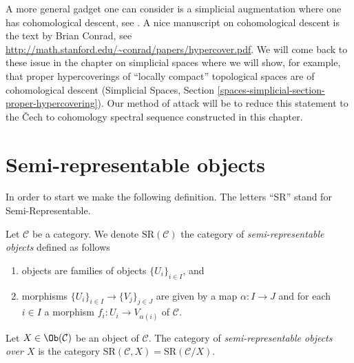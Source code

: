 \medskip\noindent
A more general gadget one can consider is a simplicial augmentation where
one has cohomological descent, see \cite[Expos\'e Vbis]{SGA4}. A nice
manuscript on cohomological descent is the text by Brian Conrad, see
\url{http://math.stanford.edu/~conrad/papers/hypercover.pdf}.
We will come back to these issue in the chapter on simplicial spaces
where we will show, for example, that proper hypercoverings of
``locally compact'' topological spaces are of cohomological
descent (Simplicial Spaces, Section
\ref{spaces-simplicial-section-proper-hypercovering}).
Our method of attack will be to reduce this statement to the {\v C}ech to
cohomology spectral sequence constructed in this chapter.






























\section{Semi-representable objects}
\label{section-semi-representable}

\noindent
In order to start we make the following definition.
The letters ``SR'' stand for Semi-Representable.

\begin{definition}
\label{definition-SR}
Let $\mathcal{C}$ be a category. We denote $\text{SR}(\mathcal{C})$
the category of {\it semi-representable objects} defined as follows
\begin{enumerate}
\item objects are families of objects $\{U_i\}_{i \in I}$, and
\item morphisms $\{U_i\}_{i \in I} \to \{V_j\}_{j \in J}$ are given by
a map $\alpha : I \to J$ and for each $i \in I$
a morphism $f_i : U_i \to V_{\alpha(i)}$ of $\mathcal{C}$.
\end{enumerate}
Let $X \in \Ob(\mathcal{C})$ be an object of $\mathcal{C}$.
The category of {\it semi-representable objects over $X$}
is the category
$\text{SR}(\mathcal{C}, X) = \text{SR}(\mathcal{C}/X)$.
\end{definition}

